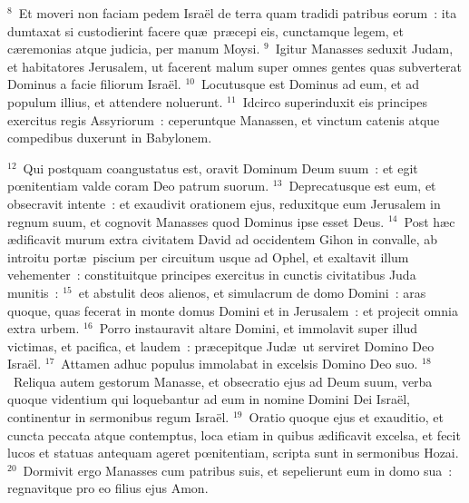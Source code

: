 ${}^{8}$~Et moveri non faciam pedem Isra\"el de terra quam tradidi patribus eorum~: ita dumtaxat si custodierint facere qu\ae\ pr\ae cepi eis, cunctamque legem, et c\ae remonias atque judicia, per manum Moysi.
${}^{9}$~Igitur Manasses seduxit Judam, et habitatores Jerusalem, ut facerent malum super omnes gentes quas subverterat Dominus a facie filiorum Isra\"el.
${}^{10}$~Locutusque est Dominus ad eum, et ad populum illius, et attendere noluerunt.
${}^{11}$~Idcirco superinduxit eis principes exercitus regis Assyriorum~: ceperuntque Manassen, et vinctum catenis atque compedibus duxerunt in Babylonem.


${}^{12}$~Qui postquam coangustatus est, oravit Dominum Deum suum~: et egit pœnitentiam valde coram Deo patrum suorum.
${}^{13}$~Deprecatusque est eum, et obsecravit intente~: et exaudivit orationem ejus, reduxitque eum Jerusalem in regnum suum, et cognovit Manasses quod Dominus ipse esset Deus.
${}^{14}$~Post h\ae c \ae dificavit murum extra civitatem David ad occidentem Gihon in convalle, ab introitu port\ae\ piscium per circuitum usque ad Ophel, et exaltavit illum vehementer~: constituitque principes exercitus in cunctis civitatibus Juda munitis~:
${}^{15}$~et abstulit deos alienos, et simulacrum de domo Domini~: aras quoque, quas fecerat in monte domus Domini et in Jerusalem~: et projecit omnia extra urbem.
${}^{16}$~Porro instauravit altare Domini, et immolavit super illud victimas, et pacifica, et laudem~: pr\ae cepitque Jud\ae\ ut serviret Domino Deo Isra\"el.
${}^{17}$~Attamen adhuc populus immolabat in excelsis Domino Deo suo.
${}^{18}$~Reliqua autem gestorum Manasse, et obsecratio ejus ad Deum suum, verba quoque videntium qui loquebantur ad eum in nomine Domini Dei Isra\"el, continentur in sermonibus regum Isra\"el.
${}^{19}$~Oratio quoque ejus et exauditio, et cuncta peccata atque contemptus, loca etiam in quibus \ae dificavit excelsa, et fecit lucos et statuas antequam ageret pœnitentiam, scripta sunt in sermonibus Hozai.
${}^{20}$~Dormivit ergo Manasses cum patribus suis, et sepelierunt eum in domo sua~: regnavitque pro eo filius ejus Amon.


